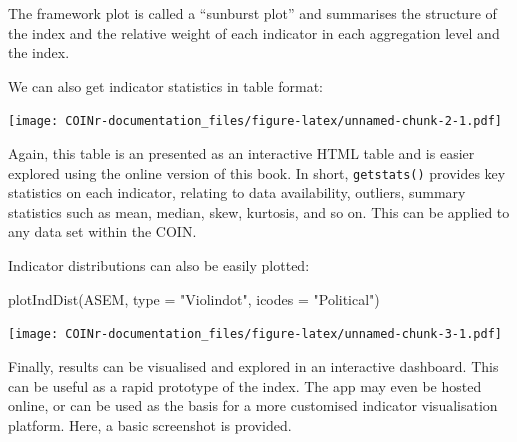 \documentclass[
]{book}
\newenvironment{Shaded}{\begin{snugshade}}{\end{snugshade}}
\newcommand{\AttributeTok}[1]{\textcolor[rgb]{0.77,0.63,0.00}{#1}}
\newcommand{\ConstantTok}[1]{\textcolor[rgb]{0.00,0.00,0.00}{#1}}
\newcommand{\DecValTok}[1]{\textcolor[rgb]{0.00,0.00,0.81}{#1}}
\newcommand{\FunctionTok}[1]{\textcolor[rgb]{0.00,0.00,0.00}{#1}}
\newcommand{\NormalTok}[1]{#1}
\newcommand{\OtherTok}[1]{\textcolor[rgb]{0.56,0.35,0.01}{#1}}
\newcommand{\SpecialCharTok}[1]{\textcolor[rgb]{0.00,0.00,0.00}{#1}}
\newcommand{\StringTok}[1]{\textcolor[rgb]{0.31,0.60,0.02}{#1}}
\begin{document}
The framework plot is called a ``sunburst plot'' and summarises the structure of the index and the relative weight of each indicator in each aggregation level and the index.

We can also get indicator statistics in table format:

\begin{Shaded}
\end{Shaded}

\texttt{[image: COINr-documentation\_files/figure-latex/unnamed-chunk-2-1.pdf]}

Again, this table is an presented as an interactive HTML table and is easier explored using the online version of this book. In short, \texttt{getstats()} provides key statistics on each indicator, relating to data availability, outliers, summary statistics such as mean, median, skew, kurtosis, and so on. This can be applied to any data set within the COIN.

Indicator distributions can also be easily plotted:

\begin{Shaded}
\begin{Highlighting}[]
\FunctionTok{plotIndDist}\NormalTok{(ASEM, }\AttributeTok{type =} \StringTok{"Violindot"}\NormalTok{, }\AttributeTok{icodes =} \StringTok{"Political"}\NormalTok{)}
\end{Highlighting}
\end{Shaded}

\texttt{[image: COINr-documentation\_files/figure-latex/unnamed-chunk-3-1.pdf]}

Finally, results can be visualised and explored in an interactive dashboard. This can be useful as a rapid prototype of the index. The app may even be hosted online, or can be used as the basis for a more customised indicator visualisation platform. Here, a basic screenshot is provided.
\end{document}
